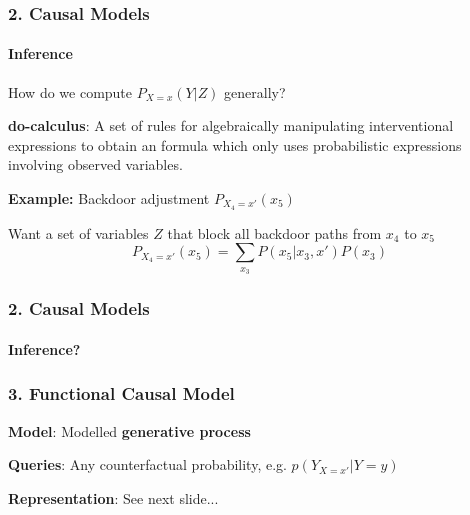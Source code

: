 \documentclass{beamer}
\begin{document}
\begin{frame}
\frametitle{2. Causal Models}
\framesubtitle{Inference}
How do we compute $P_{X=x}(Y | Z)$ generally?

\bigskip
\textbf{do-calculus}: A set of rules for algebraically manipulating interventional expressions to obtain an formula which only uses probabilistic expressions involving observed variables.

\bigskip
\textbf{Example:} Backdoor adjustment $P_{X_4 = x'}(x_5)$
\begin{center}
     \end{center}
     
Want a set of variables $Z$ that block all backdoor paths from $x_4$ to $x_5$
$$P_{X_4=x'}(x_5) = \sum_{x_3} P(x_5|x_3, x') P(x_3)$$



\end{frame}

\begin{frame}
\frametitle{2. Causal Models}
\framesubtitle{Inference?}

\end{frame}

\begin{frame}
\frametitle{3. Functional Causal Model}
\textbf{Model}: Modelled \textbf{generative process}
\bigskip

\textbf{Queries}: Any counterfactual probability, e.g. $p(Y_{X=x'}| Y=y)$


\bigskip
\textbf{Representation}: See next slide...

\end{frame}
\end{document}
